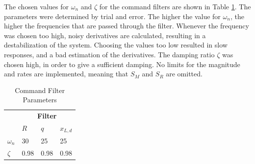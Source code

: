 The chosen values for $ \omega_n $ and $ \zeta $ for the command filters are shown in Table \ref{tab:set.cf}. 
The parameters were determined by trial and error. 
The higher the value for $ \omega_n $, the higher the frequencies that are passed through the filter. 
Whenever the frequency was chosen too high, noisy derivatives are calculated, resulting in a destabilization of the system.
Choosing the values too low resulted in slow responses, and a bad estimation of the derivatives.
The damping ratio $ \zeta $ was chosen high, in order to give a sufficient damping. No limits for the magnitude and rates are implemented, meaning that $ S_M $ and $ S_R $ are omitted.
\begin{table}[h!]
	\centering
	\caption{Command Filter Parameters}
	\label{tab:set.cf}
\begin{tabular}{|l|lll|}
	\hline
	& \multicolumn{3}{c|}{\textbf{Filter}} \\ \cline{2-4} 
	& $ R  $     & $ q $      & $ x_{L,d} $   \\ \hline
	$ \omega_n $ & 30     & 25     & 25        \\
	$ \zeta  $   & 0.98   & 0.98   & 0.98      \\ \hline
\end{tabular}
\end{table}




